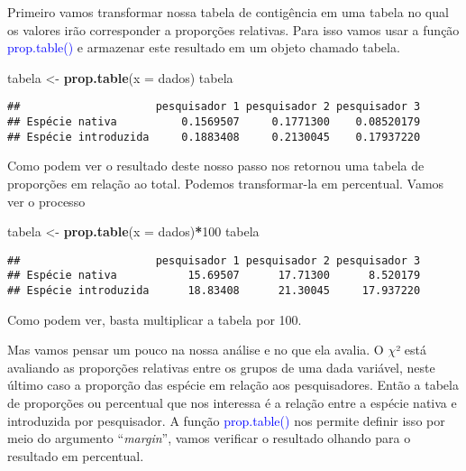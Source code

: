 \documentclass[titlepage, oneside, openany, a4paper]{book}
\newenvironment{Shaded}{\begin{snugshade}}{\end{snugshade}}
\newcommand{\DataTypeTok}[1]{\textcolor[rgb]{0.13,0.29,0.53}{#1}}
\newcommand{\DecValTok}[1]{\textcolor[rgb]{0.00,0.00,0.81}{#1}}
\newcommand{\KeywordTok}[1]{\textcolor[rgb]{0.13,0.29,0.53}{\textbf{#1}}}
\newcommand{\NormalTok}[1]{#1}
\newcommand{\OperatorTok}[1]{\textcolor[rgb]{0.81,0.36,0.00}{\textbf{#1}}}
\newcommand{\StringTok}[1]{\textcolor[rgb]{0.31,0.60,0.02}{#1}}
\begin{document}
Primeiro vamos transformar nossa tabela de contigência em uma tabela no qual os valores irão corresponder a proporções relativas. Para isso vamos usar a função \textcolor{blue}{prop.table()} e armazenar este resultado em um objeto chamado tabela.

\begin{Shaded}
\begin{Highlighting}[]
\NormalTok{tabela <-}\StringTok{ }\KeywordTok{prop.table}\NormalTok{(}\DataTypeTok{x =}\NormalTok{ dados)}
\NormalTok{tabela}
\end{Highlighting}
\end{Shaded}

\begin{verbatim}
##                     pesquisador 1 pesquisador 2 pesquisador 3
## Espécie nativa          0.1569507     0.1771300    0.08520179
## Espécie introduzida     0.1883408     0.2130045    0.17937220
\end{verbatim}

Como podem ver o resultado deste nosso passo nos retornou uma tabela de proporções em relação ao total. Podemos transformar-la em percentual. Vamos ver o processo

\begin{Shaded}
\begin{Highlighting}[]
\NormalTok{tabela <-}\StringTok{ }\KeywordTok{prop.table}\NormalTok{(}\DataTypeTok{x =}\NormalTok{ dados)}\OperatorTok{*}\DecValTok{100}
\NormalTok{tabela}
\end{Highlighting}
\end{Shaded}

\begin{verbatim}
##                     pesquisador 1 pesquisador 2 pesquisador 3
## Espécie nativa           15.69507      17.71300      8.520179
## Espécie introduzida      18.83408      21.30045     17.937220
\end{verbatim}

Como podem ver, basta multiplicar a tabela por 100.

Mas vamos pensar um pouco na nossa análise e no que ela avalia. O \(\chi\)² está avaliando as proporções relativas entre os grupos de uma dada variável, neste último caso a proporção das espécie em relação aos pesquisadores. Então a tabela de proporções ou percentual que nos interessa é a relação entre a espécie nativa e introduzida por pesquisador. A função \textcolor{blue}{prop.table()} nos permite definir isso por meio do argumento ``\emph{margin}'', vamos verificar o resultado olhando para o resultado em percentual.
\end{document}
